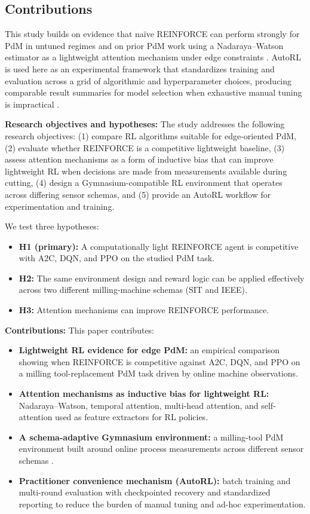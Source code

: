 \documentclass[sn-basic]{sn-jnl} %
\begin{document}
\subsection{Contributions}

This study builds on evidence that na\"{i}ve \textsc{REINFORCE} can perform strongly for PdM in untuned regimes \cite{Siraskar2025} and on prior PdM work using a Nadaraya--Watson estimator as a lightweight attention mechanism under edge constraints \cite{Siraskar2024}. AutoRL is used here as an experimental framework that standardizes training and evaluation across a grid of algorithmic and hyperparameter choices, producing comparable result summaries for model selection when exhaustive manual tuning is impractical \cite{Schwartz2020, Strubell2019, Faust2019, Mussi2022}.

\textbf{Research objectives and hypotheses:}
The study addresses the following research objectives: (1) compare RL algorithms suitable for edge-oriented PdM, (2) evaluate whether \textsc{REINFORCE} is a competitive lightweight baseline, (3) assess attention mechanisms as a form of inductive bias that can improve lightweight RL when decisions are made from measurements available during cutting, (4) design a Gymnasium-compatible RL environment that operates across differing sensor schemas, and (5) provide an AutoRL workflow for experimentation and training.

We test three hypotheses:
\begin{itemize}
		\item \textbf{H1 (primary):} A computationally light \textsc{REINFORCE} agent is competitive with \textsc{A2C}, \textsc{DQN}, and \textsc{PPO} on the studied PdM task.
		\item \textbf{H2:} The same environment design and reward logic can be applied effectively across two different milling-machine schemas (SIT and IEEE).
		\item \textbf{H3:} Attention mechanisms can improve \textsc{REINFORCE} performance.
\end{itemize}

\textbf{Contributions:}
This paper contributes:
\begin{itemize}
		\item \textbf{Lightweight RL evidence for edge PdM:} an empirical comparison showing when \textsc{REINFORCE} is competitive against \textsc{A2C}, \textsc{DQN}, and \textsc{PPO} on a milling tool-replacement PdM task driven by online machine observations.
		\item \textbf{Attention mechanisms as inductive bias for lightweight RL:} Nadaraya--Watson, temporal attention, multi-head attention, and self-attention used as feature extractors for RL policies.
		\item \textbf{A schema-adaptive Gymnasium environment:} a milling-tool PdM environment built around online process measurements across different sensor schemas \cite{Foundation2023}.
		\item \textbf{Practitioner convenience mechanism (AutoRL):} batch training and multi-round evaluation with checkpointed recovery and standardized reporting to reduce the burden of manual tuning and ad-hoc experimentation.
\end{itemize}
\end{document}
